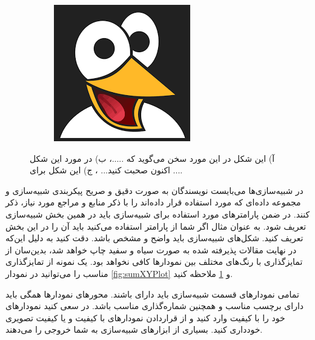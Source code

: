 \documentclass{CSICC2020}
\begin{document}
\begin{figure}
\begin{subfigure}[b]{0.31\textwidth}
\caption{}
\label{fig:tiger}
\end{subfigure}
\begin{subfigure}[b]{0.31\textwidth}
\includegraphics[width=\linewidth]{./Images/blank}
\caption{}
\label{fig:EntropyVersus}
\end{subfigure}
\caption{
آ) این شکل در این مورد سخن می‌گوید که .....، ب) در مورد این شکل اکنون صحبت کنید... ، ج) این شکل برای ....
}
\label{fig:animals}
\end{figure}
در شبیه‌سازی‌ها می‌بایست نویسندگان به صورت دقیق و صریح پیکربندی شبیه‌سازی و مجموعه داده‌ای که مورد استفاده قرار داده‌اند را با ذکر منابع و مراجع مورد نیاز، ذکر کنند. در ضمن پارامترهای مورد استفاده برای شبیه‌سازی باید در همین بخش شبیه‌سازی تعریف شود. به عنوان مثال اگر شما از پارامتر 
استفاده می‌کنید باید آن را در این بخش تعریف کنید. شکل‌های شبیه‌سازی باید واضح و مشخص باشد. دقت کنید به دلیل این‌که در نهایت مقالات پذیرفته شده به صورت سیاه و سفید چاپ خواهد شد، بدین‌سان از تمایزگذاری با رنگ‌های مختلف بین نمودارها کافی نخواهد بود. یک نمونه از تمایزگذاری مناسب را می‌توانید در نمودار \ref{fig:sumXYPlot} و \ref{fig:tiger} ملاحظه کنید. 

تمامی نمودارهای قسمت شبیه‌سازی باید دارای   باشند. محور‌های نمودارها همگی باید دارای برچسب مناسب و همچنین شماره‌گذاری مناسب باشد. در \lr{\LaTeX} سعی کنید نمودارهای خود را با کیفیت  وارد کنید و از قراردادن نمودارهای  با کیفیت  و یا کیفیت تصویری خودداری کنید. بسیاری از ابزارهای شبیه‌سازی به شما خروجی   را می‌دهند. 
\end{document}
